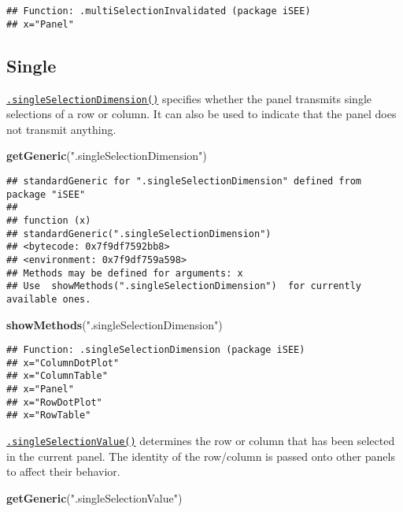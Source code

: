 \documentclass[
]{book}
\newenvironment{Shaded}{\begin{snugshade}}{\end{snugshade}}
\newcommand{\KeywordTok}[1]{\textcolor[rgb]{0.13,0.29,0.53}{\textbf{#1}}}
\newcommand{\NormalTok}[1]{#1}
\newcommand{\StringTok}[1]{\textcolor[rgb]{0.31,0.60,0.02}{#1}}
\begin{document}
\begin{verbatim}
## Function: .multiSelectionInvalidated (package iSEE)
## x="Panel"
\end{verbatim}

\hypertarget{single}{%
\subsection{Single}\label{single}}

\href{https://isee.github.io/iSEE/reference/single-select-generics.html}{\texttt{.singleSelectionDimension()}} specifies whether the panel transmits single selections of a row or column.
It can also be used to indicate that the panel does not transmit anything.

\begin{Shaded}
\begin{Highlighting}[]
\KeywordTok{getGeneric}\NormalTok{(}\StringTok{".singleSelectionDimension"}\NormalTok{)}
\end{Highlighting}
\end{Shaded}

\begin{verbatim}
## standardGeneric for ".singleSelectionDimension" defined from package "iSEE"
## 
## function (x) 
## standardGeneric(".singleSelectionDimension")
## <bytecode: 0x7f9df7592bb8>
## <environment: 0x7f9df759a598>
## Methods may be defined for arguments: x
## Use  showMethods(".singleSelectionDimension")  for currently available ones.
\end{verbatim}

\begin{Shaded}
\begin{Highlighting}[]
\KeywordTok{showMethods}\NormalTok{(}\StringTok{".singleSelectionDimension"}\NormalTok{)}
\end{Highlighting}
\end{Shaded}

\begin{verbatim}
## Function: .singleSelectionDimension (package iSEE)
## x="ColumnDotPlot"
## x="ColumnTable"
## x="Panel"
## x="RowDotPlot"
## x="RowTable"
\end{verbatim}

\href{https://isee.github.io/iSEE/reference/single-select-generics.html}{\texttt{.singleSelectionValue()}} determines the row or column that has been selected in the current panel.
The identity of the row/column is passed onto other panels to affect their behavior.

\begin{Shaded}
\begin{Highlighting}[]
\KeywordTok{getGeneric}\NormalTok{(}\StringTok{".singleSelectionValue"}\NormalTok{)}
\end{Highlighting}
\end{Shaded}
\end{document}
